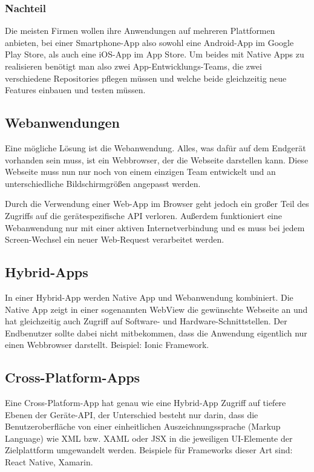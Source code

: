 \subsubsection{Nachteil}
Die meisten Firmen wollen ihre Anwendungen auf mehreren Plattformen anbieten, bei einer
Smartphone-App also sowohl eine Android-App im Google Play Store, als auch eine iOS-App im App Store.
Um beides mit Native Apps zu realisieren benötigt man also zwei App-Entwicklungs-Teams, die zwei
verschiedene Repositories pflegen müssen und welche beide gleichzeitig neue Features einbauen und
testen müssen.

\subsection{Webanwendungen}
Eine mögliche Lösung ist die Webanwendung. Alles, was dafür auf dem Endgerät vorhanden sein muss,
ist ein Webbrowser, der die Webseite darstellen kann. Diese Webseite muss nun nur noch von einem
einzigen Team entwickelt und an unterschiedliche Bildschirmgrößen angepasst werden.

Durch die Verwendung einer Web-App im Browser geht jedoch ein großer Teil des Zugriffs auf die
gerätespezifische API verloren. Außerdem funktioniert eine Webanwendung nur mit einer aktiven
Internetverbindung und es muss bei jedem Screen-Wechsel ein neuer Web-Request verarbeitet werden.

\subsection{Hybrid-Apps}
In einer Hybrid-App werden Native App und Webanwendung kombiniert. Die Native App zeigt in einer
sogenannten WebView die gewünschte Webseite an und hat gleichzeitig auch Zugriff auf Software- und
Hardware-Schnittstellen. Der Endbenutzer sollte dabei nicht mitbekommen, dass die Anwendung
eigentlich nur einen Webbrowser darstellt. Beispiel: Ionic Framework.

\subsection{Cross-Platform-Apps}
Eine Cross-Platform-App hat genau wie eine Hybrid-App Zugriff auf tiefere Ebenen der Geräte-API,
der Unterschied besteht nur darin, dass die Benutzeroberfläche von einer einheitlichen
Auszeichnungssprache (Markup Language) wie XML bzw. XAML oder JSX in die jeweiligen UI-Elemente der
Zielplattform umgewandelt werden. Beispiele für Frameworks dieser Art sind: React Native, Xamarin.

\newpage

\newpage

\newpage

\newpage

\newpage